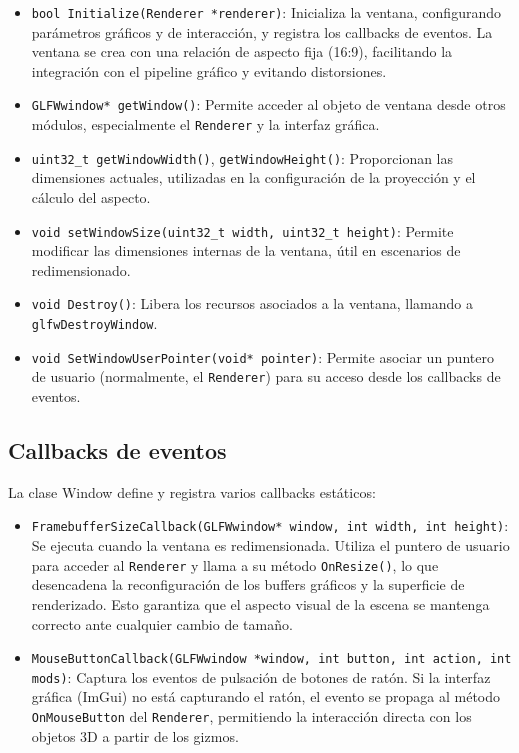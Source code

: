 \begin{itemize}
    \item \texttt{bool Initialize(Renderer *renderer)}: Inicializa la ventana, configurando parámetros gráficos y de interacción, y registra los callbacks de eventos. La ventana se crea con una relación de aspecto fija (16:9), facilitando la integración con el pipeline gráfico y evitando distorsiones.
    \item \texttt{GLFWwindow* getWindow()}: Permite acceder al objeto de ventana desde otros módulos, especialmente el \texttt{Renderer} y la interfaz gráfica.
    \item \texttt{uint32\_t getWindowWidth()}, \texttt{getWindowHeight()}: Proporcionan las dimensiones actuales, utilizadas en la configuración de la proyección y el cálculo del aspecto.
    \item \texttt{void setWindowSize(uint32\_t width, uint32\_t height)}: Permite modificar las dimensiones internas de la ventana, útil en escenarios de redimensionado.
    \item \texttt{void Destroy()}: Libera los recursos asociados a la ventana, llamando a \texttt{glfwDestroyWindow}.
    \item \texttt{void SetWindowUserPointer(void* pointer)}: Permite asociar un puntero de usuario (normalmente, el \texttt{Renderer}) para su acceso desde los callbacks de eventos.
\end{itemize}

\subsection{Callbacks de eventos}

La clase Window define y registra varios callbacks estáticos:

\begin{itemize}
    \item \texttt{FramebufferSizeCallback(GLFWwindow* window, int width, int height)}: Se ejecuta cuando la ventana es redimensionada. Utiliza el puntero de usuario para acceder al \texttt{Renderer} y llama a su método \texttt{OnResize()}, lo que desencadena la reconfiguración de los buffers gráficos y la superficie de renderizado. Esto garantiza que el aspecto visual de la escena se mantenga correcto ante cualquier cambio de tamaño.
    \item \texttt{MouseButtonCallback(GLFWwindow *window, int button, int action, int mods)}: Captura los eventos de pulsación de botones de ratón. Si la interfaz gráfica (ImGui) no está capturando el ratón, el evento se propaga al método \texttt{OnMouseButton} del \texttt{Renderer}, permitiendo la interacción directa con los objetos 3D a partir de los gizmos.
\end{itemize}

